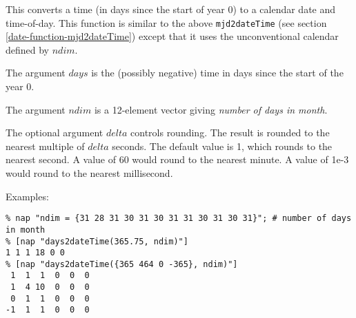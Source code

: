 This converts a time (in days since the start of year 0) to a calendar date and time-of-day.
This function is similar to the above 
\texttt{mjd2dateTime}
(see section \ref{date-function-mjd2dateTime})
except that it uses the unconventional calendar defined by $ndim$.

The argument 
      $days$ is the (possibly negative) time in days since the
      start of the year 0.

The argument 
      $ndim$ is a 12-element vector giving 
      \emph{number of days in month}.
      

The optional argument 
      $delta$ controls rounding. The result is rounded to the
      nearest multiple of 
      $delta$ seconds. The default value is 1, which rounds to
      the nearest second. A value of 60 would round to the nearest
      minute. A value of 1e-3 would round to the nearest
      millisecond.
      

Examples:
      \begin{verbatim}
% nap "ndim = {31 28 31 30 31 30 31 31 30 31 30 31}"; # number of days in month
% [nap "days2dateTime(365.75, ndim)"]
1 1 1 18 0 0
% [nap "days2dateTime({365 464 0 -365}, ndim)"]
 1  1  1  0  0  0
 1  4 10  0  0  0
 0  1  1  0  0  0
-1  1  1  0  0  0
\end{verbatim}

